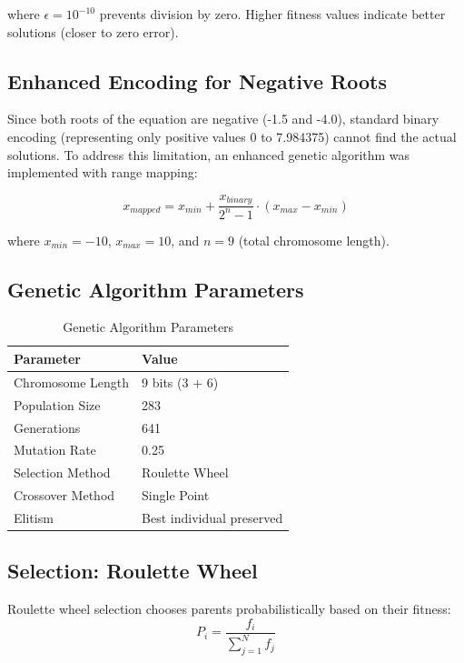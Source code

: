 \documentclass[11pt,a4paper]{article}
\begin{document}
where $\epsilon = 10^{-10}$ prevents division by zero. Higher fitness values indicate better solutions (closer to zero error).

\subsection{Enhanced Encoding for Negative Roots}
Since both roots of the equation are negative (-1.5 and -4.0), standard binary encoding (representing only positive values 0 to 7.984375) cannot find the actual solutions. To address this limitation, an enhanced genetic algorithm was implemented with range mapping:

\begin{equation}
x_{mapped} = x_{min} + \frac{x_{binary}}{2^n - 1} \cdot (x_{max} - x_{min})
\end{equation}

where $x_{min} = -10$, $x_{max} = 10$, and $n = 9$ (total chromosome length).

\subsection{Genetic Algorithm Parameters}
\begin{table}[H]
\centering
\begin{tabular}{@{}ll@{}}
\toprule
Parameter & Value \\
\midrule
Chromosome Length & 9 bits (3 + 6) \\
Population Size & 283 \\
Generations & 641 \\
Mutation Rate & 0.25 \\
Selection Method & Roulette Wheel \\
Crossover Method & Single Point \\
Elitism & Best individual preserved \\
\bottomrule
\end{tabular}
\caption{Genetic Algorithm Parameters}
\label{tab:parameters}
\end{table}

\subsection{Selection: Roulette Wheel}
Roulette wheel selection chooses parents probabilistically based on their fitness:
\begin{equation}
P_i = \frac{f_i}{\sum_{j=1}^{N} f_j}
\end{equation}
\end{document}

